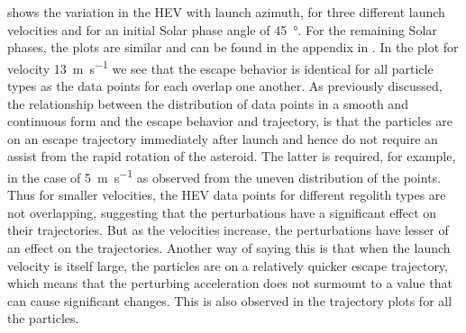  shows the variation in the \gls{HEV} with launch azimuth, for three different launch velocities and for an initial Solar phase angle of \SI{45}{\degree}. For the remaining Solar phases, the plots are similar and can be found in the appendix in . In the plot for velocity \SI{13}{\metre\per\second} we see that the escape behavior is identical for all particle types as the data points for each overlap one another. As previously discussed, the relationship between the distribution of data points in a smooth and continuous form and the escape behavior and trajectory, is that the particles are on an escape trajectory immediately after launch and hence do not require an assist from the rapid rotation of the asteroid. The latter is required, for example, in the case of \SI{5}{\metre\per\second} as observed from the uneven distribution of the points. Thus for smaller velocities, the \gls{HEV} data points for different regolith types are not overlapping, suggesting that the perturbations have a significant effect on their trajectories. But as the velocities increase, the perturbations have lesser of an effect on the trajectories. Another way of saying this is that when the launch velocity is itself large, the particles are on a relatively quicker escape trajectory, which means that the perturbing acceleration does not surmount to a value that can cause significant changes. This is also observed in the trajectory plots for all the particles.
%
\newline\newline
%
